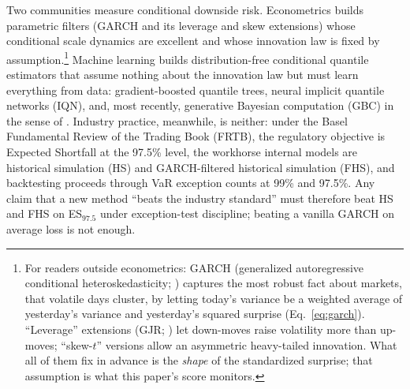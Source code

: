 \documentclass[11pt]{article}
\theoremstyle{remark}
\begin{document}
Two communities measure conditional downside risk. Econometrics builds
parametric filters (GARCH and its leverage and skew extensions) whose
conditional scale dynamics are excellent and whose innovation law
is fixed by assumption.\footnote{For readers outside econometrics:
GARCH (generalized autoregressive conditional heteroskedasticity;
\citealp{engle1982, bollerslev1986}) captures the most robust fact
about markets, that volatile days cluster, by letting today's variance
be a weighted average of yesterday's variance and yesterday's squared
surprise (Eq.~\ref{eq:garch}). ``Leverage'' extensions (GJR;
\citealp{glosten1993}) let down-moves raise volatility more than
up-moves; ``skew-$t$'' versions allow an asymmetric heavy-tailed
innovation. What all of them fix in advance is the \emph{shape} of the
standardized surprise; that assumption is what this paper's score
monitors.} Machine learning builds distribution-free
conditional quantile estimators that assume nothing about the
innovation law but must learn everything from data: gradient-boosted
quantile trees, neural implicit quantile networks (IQN), and, most
recently, generative Bayesian computation (GBC) in the sense of
\citet{polson2023gbc}. Industry practice, meanwhile, is neither: under the Basel
Fundamental Review of the Trading Book (FRTB), the regulatory objective
is Expected Shortfall at the 97.5\% level, the workhorse internal models
are historical simulation (HS) and GARCH-filtered historical simulation
(FHS), and backtesting proceeds through VaR exception counts at 99\% and
97.5\%. Any claim that a new method ``beats the industry standard'' must
therefore beat HS and FHS on ES$_{97.5}$ under exception-test
discipline; beating a vanilla GARCH on average loss is not enough.
\end{document}
